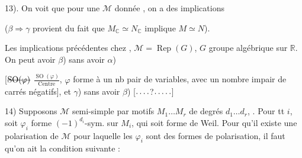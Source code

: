 13). On voit que pour une $\mathcal M$ donnée , on a des implications


($\beta\Rightarrow\gamma$ provient du fait que $M_{\mathbb C}\simeq N_{\mathbb C}$ implique $M\simeq N$).


Les implications précédentes   chez , $\mathcal M=\operatorname{Rep}(G)$, $G$ groupe algébrique   sur $\mathbb R$. On peut avoir $\beta$)  sans avoir $\alpha$)


[$\deleted{\operatorname{SO}(\varphi)}$  $\frac{\operatorname{SO}(\varphi)}{\text{Centre}}$, $\varphi$ forme à un nb pair de variables, avec un nombre impair de carrés négatifs], et $\gamma$) sans avoir $\beta$) [$\ldotp\ldotp\ldotp\ldotp$\quad ?\quad$\ldotp\ldotp\ldotp\ldotp\ldotp$]


14) Supposons $\mathcal M$ semi-simple   par motifs $M_1\ldots M_r$ de degrés $d_1\ldots d_r$,   . Pour tt $i$, soit $\varphi_i$ forme $(-1)^{d_i}$-sym. sur $M_i$, qui soit  forme de Weil.  Pour qu'il existe une polarisation de $\mathcal M$  pour laquelle les $\varphi_i$ sont des formes de polarisation, il  faut qu'on ait la condition suivante :

